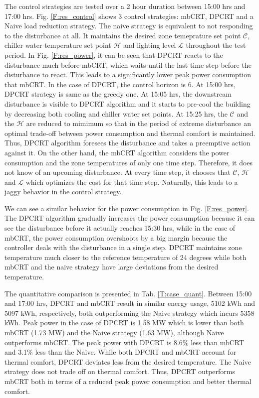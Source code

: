 The control strategies are tested over a 2 hour duration between 15:00 hrs and 17:00 hrs. Fig. \ref{F:res_control} shows 3 control strategies: mbCRT, DPCRT and a Naive load reduction strategy. The naive strategy is equivalent to not responding to the disturbance at all. It maintains the desired zone temeprature set point $\mathcal{C}$, chiller water temperature set point $\mathcal{H}$ and lighting level $\mathcal{L}$ throughout the test period.
In Fig. \ref{F:res_power}, it can be seen that DPCRT reacts to the disturbance much before mbCRT, which waits until the last time-step before the disturbance to react. This leads to a significantly lower peak power consumption that mbCRT.
In the case of DPCRT, the control horizon is 6. 
At 15:00 hrs, DPCRT strategy is same as the greedy one. At 15:05 hrs, the downstream disturbance is visible to DPCRT algorithm and it starts to pre-cool the building by decreasing both cooling and chiller water set points. At 15:25 hrs, the $\mathcal{C}$ and the $\mathcal{H}$ are reduced to mimimum so that in the period of extreme disturbance an optimal trade-off between power consumption and thermal comfort is maintained. Thus, DPCRT algorithm foresees the disturbance and takes a preemptive action against it.  On the other hand, the mbCRT algorithm considers the power consumption and the zone temperatures of only one time step. Therefore, it does not know of an upcoming disturbance. At every time step, it chooses that $\mathcal{C}$, $\mathcal{H}$ and $\mathcal{L}$ which optimizes the cost for that time step. Naturally, this leads to a jaggy behavior in the control strategy.

We can see a similar behavior for the power consumption in Fig. \ref{F:res_power}. The DPCRT algorithm gradually increases the power consumption because it can see the disturbance before it actually reaches 15:30 hrs, while in the case of mbCRT, the power consumption overshoots by a big margin because the controller deals with the disturbance in a single step. DPCRT maintains zone temperature much closer to the reference temperature of 24 degrees while both mbCRT and the naive strategy have large deviations from the desired temperature. 

The quantitative comparison is presented in Tab. \ref{T:case_quant}. Between 15:00 and 17:00 hrs, DPCRT and mbCRT result in similar energy usage, 5102 kWh and 5097 kWh, respectively, both outperforming the Naive strategy which incurs 5358 kWh. Peak power in the case of DPCRT is 1.58 MW which is lower than both mbCRT (1.73 MW) and the Naive strategy (1.63 MW), although Naive outperforms mbCRT. The peak power with DPCRT is 8.6\% less than mbCRT and 3.1\% less than the Naive. While both DPCRT and mbCRT account for thermal comfort, DPCRT deviates less from the desired temperature. The Naive strategy does not trade off on thermal comfort. Thus, DPCRT outperforms mbCRT both in terms of a reduced peak power consumption and better thermal comfort.

